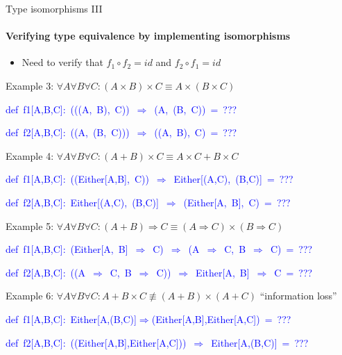 \documentclass[english]{beamer}
\newenvironment{lyxcode}
   {\par\begin{list}{}{
     \setlength{\rightmargin}{\leftmargin}
     \setlength{\listparindent}{0pt}%
     \raggedright
     \setlength{\itemsep}{0pt}
     \setlength{\parsep}{0pt}
     \normalfont\ttfamily}%
    \def\{{\char`\{}
    \def\}{\char`\}}
    \def\textasciitilde{\char`\~}
    \item[]}
   {\end{list}}
\begin{document}
\begin{frame}{Type isomorphisms III}


\framesubtitle{Verifying type equivalence by implementing isomorphisms}
\begin{itemize}
\item Need to verify that $f_{1}\circ f_{2}=id$ and $f_{2}\circ f_{1}=id$
\end{itemize}
Example 3: $\forall A\forall B\forall C:(A\times B)\times C\equiv A\times(B\times C)$
\begin{lyxcode}
\textcolor{blue}{\footnotesize{}def~f1{[}A,B,C{]}:~(((A,~B),~C))~$\Rightarrow$~(A,~(B,~C))~=~???}{\footnotesize \par}

\textcolor{blue}{\footnotesize{}def~f2{[}A,B,C{]}:~((A,~(B,~C)))~$\Rightarrow$~((A,~B),~C)~=~???}{\footnotesize \par}
\end{lyxcode}
Example 4: $\forall A\forall B\forall C:(A+B)\times C\equiv A\times C+B\times C$
\begin{lyxcode}
\textcolor{blue}{\footnotesize{}def~f1{[}A,B,C{]}:~((Either{[}A,B{]},~C))~$\Rightarrow$~Either{[}(A,C),~(B,C){]}~=~???}{\footnotesize \par}

\textcolor{blue}{\footnotesize{}def~f2{[}A,B,C{]}:~Either{[}(A,C),~(B,C){]}~$\Rightarrow$~(Either{[}A,~B{]},~C)~=~???}{\footnotesize \par}
\end{lyxcode}
Example 5: $\forall A\forall B\forall C:(A+B)\Rightarrow C\equiv(A\Rightarrow C)\times(B\Rightarrow C)$
\begin{lyxcode}
\textcolor{blue}{\footnotesize{}def~f1{[}A,B,C{]}:~(Either{[}A,~B{]}~$\Rightarrow$~C)~$\Rightarrow$~(A~$\Rightarrow$~C,~B~$\Rightarrow$~C)~=~???}{\footnotesize \par}

\textcolor{blue}{\footnotesize{}def~f2{[}A,B,C{]}:~((A~$\Rightarrow$~C,~B~$\Rightarrow$~C))~$\Rightarrow$~Either{[}A,~B{]}~$\Rightarrow$~C~=~???}{\footnotesize \par}
\end{lyxcode}
Example 6: $\forall A\forall B\forall C:A+B\times C\not\equiv(A+B)\times(A+C)$
\textendash{} ``information loss''
\begin{lyxcode}
\textcolor{blue}{\footnotesize{}def~f1{[}A,B,C{]}:~Either{[}A,(B,C){]}$\Rightarrow$(Either{[}A,B{]},Either{[}A,C{]})~=~???}{\footnotesize \par}

\textcolor{blue}{\footnotesize{}def~f2{[}A,B,C{]}:~((Either{[}A,B{]},Either{[}A,C{]}))~$\Rightarrow$~Either{[}A,(B,C){]}~=~???}{\footnotesize \par}
\end{lyxcode}
\end{frame}
\end{document}
